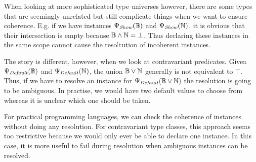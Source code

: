 When looking at more sophisticated type universes however, there are some types that are seemingly unrelated but still complicate things when we want to ensure coherence.
E.g. if we have instances $\Psi_\mathit{Show}(\mathbb{B})$ and $\Psi_\mathit{Show}(\mathbb{N})$, it is obvious that their intersection is empty  because $\mathbb{B} \wedge \mathbb{N} = \bot$.
Thus declaring these instances in the same scope cannot cause the resoltution of incoherent instances.

The story is different, however, when we look at contravariant predicates.
Given $\Psi_\mathit{Default}(\mathbb{B})$ and $\Psi_\mathit{Default}(\mathbb{N})$, the union $\mathbb{B} \vee \mathbb{N}$ generally is not equivalent to $\top$. %
Thus, if we have to resolve an instance for $\Psi_\mathit{Default}(\mathbb{B} \vee \mathbb{N})$ the resolution is going to be ambiguous.
In practise, we would have two default values to choose from whereas it is unclear which one should be taken.

For practical programming languages, we can check the coherence of instances without doing any resolution.
For contravariant type classes, this approach seems too restrictive because we would only ever be able to declare one instance.
In this case, it is more useful to fail during resolution when ambiguous instances can be resolved.
